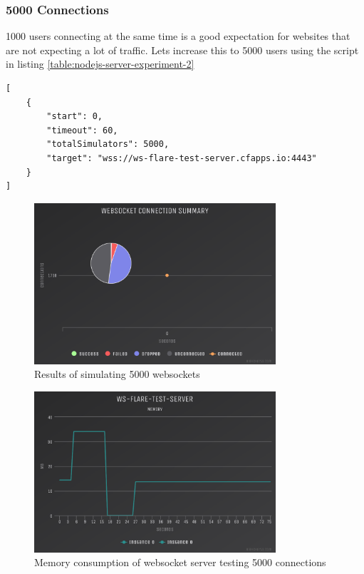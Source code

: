 \subsubsection{5000 Connections}

1000 users connecting at the same time is a good expectation for websites that are not expecting a lot of traffic. Lets increase this to 5000 users using the script in listing \ref{table:nodejs-server-experiment-2}

\begin{listing}[H]
    \caption{WS-Flare test script for 5000 users}
    \label{table:nodejs-server-experiment-2}
    \begin{verbatim}
[
    {
        "start": 0,
        "timeout": 60,
        "totalSimulators": 5000,
        "target": "wss://ws-flare-test-server.cfapps.io:4443"
    }
]
\end{verbatim}
\end{listing}

\begin{figure}[H]
  \centering
    \includegraphics[width=0.8\textwidth]{figures/experiments/experiment-1/node-js/conn-summary-5000.png}
    \caption{Results of simulating 5000 websockets}
    \label{fig:experiment-1-conn-summary-5000}
\end{figure}

\begin{figure}[H]
  \centering
    \includegraphics[width=0.8\textwidth]{figures/experiments/experiment-1/node-js/memory-5000.png}
    \caption{Memory consumption of websocket server testing 5000 connections}
    \label{fig:experiment-1-memory-5000}
\end{figure}

